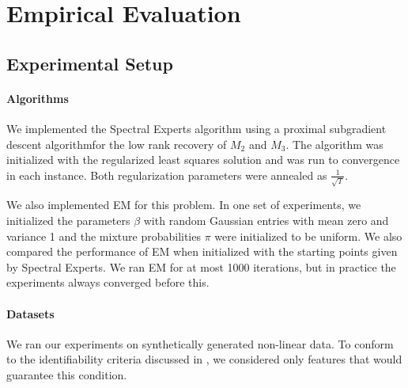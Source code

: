 \section{Empirical Evaluation}
\label{sec:evaluation}

\subsection{Experimental Setup}

\paragraph{Algorithms}

We implemented the Spectral Experts algorithm using a proximal
subgradient descent algorithm\citationneeded for the low rank recovery
of $M_2$ and $M_3$. The algorithm was initialized with the regularized
least squares solution and was run to convergence in each instance. Both
regularization parameters were annealed as $\frac{1}{\sqrt{T}}$. 

We also implemented EM for this problem. In one set of experiments, we
initialized the parameters $\beta$ with random Gaussian entries with
mean zero and variance 1 and the mixture probabilities $\pi$ were
initialized to be uniform. We also compared the performance of EM when
initialized with the starting points given by Spectral Experts. We ran
EM for at most 1000 iterations, but in practice the experiments always
converged before this.

\paragraph{Datasets}

We ran our experiments on synthetically generated non-linear data. To
conform to the identifiability criteria discussed in
, we considered only features that would guarantee
this condition.

